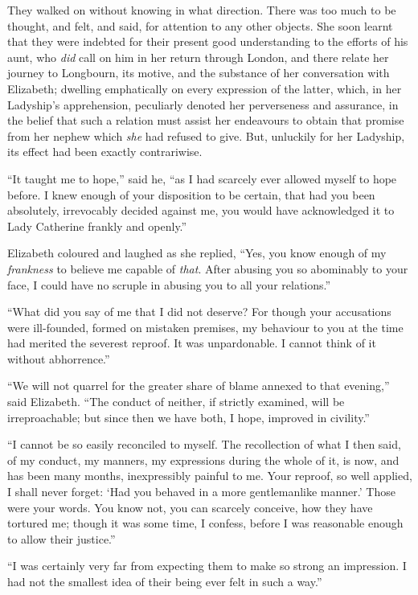 They walked on without knowing in what direction. There was too much to be thought, and felt, and said, for attention to any other objects. She soon learnt that they were indebted for their present good understanding to the efforts of his aunt, who \textit{did} call on him in her return through London, and there relate her journey to Longbourn, its motive, and the substance of her conversation with Elizabeth; dwelling emphatically on every expression of the latter, which, in her Ladyship's apprehension, peculiarly denoted her perverseness and assurance, in the belief that such a relation must assist her endeavours to obtain that promise from her nephew which \textit{she} had refused to give. But, unluckily for her Ladyship, its effect had been exactly contrariwise.

``It taught me to hope,'' said he, ``as I had scarcely ever allowed myself to hope before. I knew enough of your disposition to be certain, that had you been absolutely, irrevocably decided against me, you would have acknowledged it to Lady Catherine frankly and openly.''

Elizabeth coloured and laughed as she replied, ``Yes, you know enough of my \textit{frankness} to believe me capable of \textit{that}. After abusing you so abominably to your face, I could have no scruple in abusing you to all your relations.''

``What did you say of me that I did not deserve? For though your accusations were ill-founded, formed on mistaken premises, my behaviour to you at the time had merited the severest reproof. It was unpardonable. I cannot think of it without abhorrence.''

``We will not quarrel for the greater share of blame annexed to that evening,'' said Elizabeth. ``The conduct of neither, if strictly examined, will be irreproachable; but since then we have both, I hope, improved in civility.''

``I cannot be so easily reconciled to myself. The recollection of what I then said, of my conduct, my manners, my expressions during the whole of it, is now, and has been many months, inexpressibly painful to me. Your reproof, so well applied, I shall never forget: `Had you behaved in a more gentlemanlike manner.' Those were your words. You know not, you can scarcely conceive, how they have tortured me; though it was some time, I confess, before I was reasonable enough to allow their justice.''

``I was certainly very far from expecting them to make so strong an impression. I had not the smallest idea of their being ever felt in such a way.''

